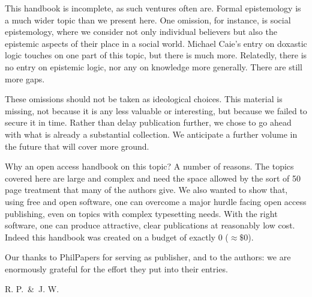 This handbook is incomplete, as such ventures often are. Formal epistemology is a much wider topic than we present here. One omission, for instance, is social epistemology, where we consider not only individual believers but also the epistemic aspects of their place in a social world. Michael Caie's entry on doxastic logic touches on one part of this topic, but there is much more. Relatedly, there is no entry on epistemic logic, nor any on knowledge more generally. There are still more gaps.

These omissions should not be taken as ideological choices. This material is missing, not because it is any less valuable or interesting, but because we failed to secure it in time. Rather than delay publication further, we chose to go ahead with what is already a substantial collection. We anticipate a further volume in the future that will cover more ground.

Why an open access handbook on this topic? A number of reasons. The topics covered here are large and complex and need the space allowed by the sort of 50 page treatment that many of the authors give. We also wanted to show that, using free and open software, one can overcome a major hurdle facing open access publishing, even on topics with complex typesetting needs. With the right software, one can produce attractive, clear publications at reasonably low cost. Indeed this handbook was created on a budget of exactly \textsterling$0$ ($\approx \$ 0$).

Our thanks to PhilPapers for serving as publisher, and to the authors: we are enormously grateful for the effort they put into their entries.

\bigskip

\hfill R. P. \,\&\, J. W.

\endgroup

